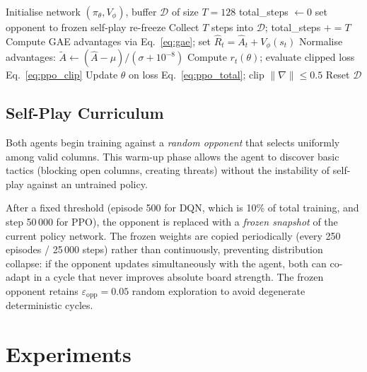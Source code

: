 \documentclass[10pt, letterpaper, twocolumn]{article}
\newcommand{\eps}{\varepsilon}
\begin{document}
\begin{algorithm}[t]
\caption{PPO Training}
\label{alg:ppo}
\begin{algorithmic}[1]
\State Initialise network $(\pi_\theta, V_\phi)$, buffer $\mathcal{D}$ of size $T{=}128$
\State total\_steps $\gets 0$
   set opponent to frozen self-play \EndIf
   re-freeze \EndIf
  \State Collect $T$ steps into $\mathcal{D}$; total\_steps $\mathrel{+}= T$
  \State Compute GAE advantages via Eq.~\eqref{eq:gae}; set $\hat{R}_t = \hat{A}_t + V_\phi(s_t)$
  \State Normalise advantages: $\tilde{A} \gets (\hat{A} - \mu) / (\sigma + 10^{-8})$
      \State Compute $r_t(\theta)$; evaluate clipped loss Eq.~\eqref{eq:ppo_clip}
      \State Update $\theta$ on loss Eq.~\eqref{eq:ppo_total}; clip $\|\nabla\| \leq 0.5$
    \EndFor
  \EndFor
  \State Reset $\mathcal{D}$
\EndWhile
\end{algorithmic}
\end{algorithm}

\subsection{Self-Play Curriculum}
\label{sec:curriculum}

Both agents begin training against a \emph{random opponent} that selects
uniformly among valid columns.  This warm-up phase allows the agent to
discover basic tactics (blocking open columns, creating threats) without
the instability of self-play against an untrained policy.

After a fixed threshold (episode 500 for DQN, which is 10\% of total
training, and step 50\,000 for PPO), the opponent is replaced with a
\emph{frozen snapshot} of the current policy network.  The frozen weights
are copied periodically (every 250 episodes / 25\,000 steps) rather than
continuously, preventing distribution collapse: if the opponent updates
simultaneously with the agent, both can co-adapt in a cycle that never
improves absolute board strength.  The frozen opponent retains
$\eps_{\text{opp}} = 0.05$ random exploration to avoid degenerate
deterministic cycles.

\section{Experiments}
\label{sec:experiments}
\end{document}

